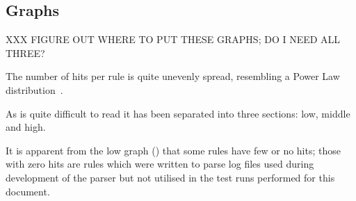 \subsection{Graphs}

XXX FIGURE OUT WHERE TO PUT THESE GRAPHS\@; DO I NEED ALL THREE\@?


The number of hits per rule is quite unevenly spread, resembling a Power
Law distribution~\cite{powerlaw}.


As  is quite difficult to read it has been
separated into three sections: low, middle and high.


It is apparent from the low graph ()
that some rules have few or no hits; those with zero hits are rules which
were written to parse log files used during development of the parser but
not utilised in the test runs performed for this document.



\clearpage{}
